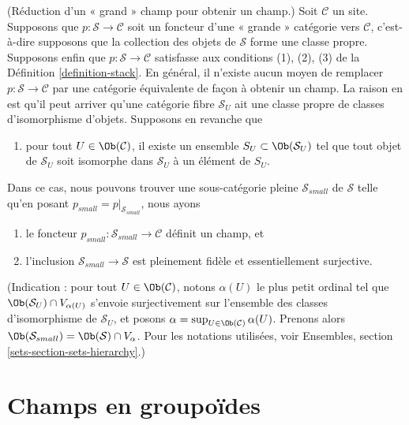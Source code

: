 \begin{remark}
\label{remark-stack-make-small}
(Réduction d'un « grand » champ pour obtenir un champ.)
Soit $\mathcal{C}$ un site. Supposons que $p : \mathcal{S} \to \mathcal{C}$
soit un foncteur d'une « grande » catégorie vers $\mathcal{C}$, c'est-à-dire supposons
que la collection des objets de $\mathcal{S}$ forme une classe propre.
Supposons enfin que $p : \mathcal{S} \to \mathcal{C}$ satisfasse
aux conditions (1), (2), (3) de la
Définition \ref{definition-stack}.
En général, il n'existe aucun moyen de remplacer $p : \mathcal{S} \to \mathcal{C}$
par une catégorie équivalente de façon à obtenir un champ. La raison en est qu'il
peut arriver qu'une catégorie fibre $\mathcal{S}_U$ ait une classe propre
de classes d'isomorphisme d'objets.
Supposons en revanche que
\begin{enumerate}
\item[(4)] pour tout $U \in \Ob(\mathcal{C})$, il existe un ensemble
$S_U \subset \Ob(\mathcal{S}_U)$ tel que tout objet de
$\mathcal{S}_U$ soit isomorphe dans $\mathcal{S}_U$ à un élément de $S_U$.
\end{enumerate}
Dans ce cas, nous pouvons trouver une sous-catégorie pleine $\mathcal{S}_{small}$
de $\mathcal{S}$ telle qu'en posant $p_{small} = p|_{\mathcal{S}_{small}}$,
nous ayons
\begin{enumerate}
\item[(a)] le foncteur $p_{small} : \mathcal{S}_{small} \to \mathcal{C}$
définit un champ, et
\item[(b)] l'inclusion $\mathcal{S}_{small} \to \mathcal{S}$
est pleinement fidèle et essentiellement surjective.
\end{enumerate}
(Indication : pour tout $U \in \Ob(\mathcal{C})$,
notons $\alpha(U)$ le plus petit ordinal tel que
$\Ob(\mathcal{S}_U) \cap V_{\alpha(U)}$ s'envoie surjectivement sur l'ensemble
des classes d'isomorphisme de $\mathcal{S}_U$, et posons
$\alpha = \sup_{U \in \Ob(\mathcal{C})} \alpha(U)$.
Prenons alors
$\Ob(\mathcal{S}_{small}) = \Ob(\mathcal{S}) \cap V_\alpha$.
Pour les notations utilisées, voir Ensembles, section \ref{sets-section-sets-hierarchy}.)
\end{remark}







\section{Champs en groupoïdes}
\label{section-stacks-in-groupoids}

